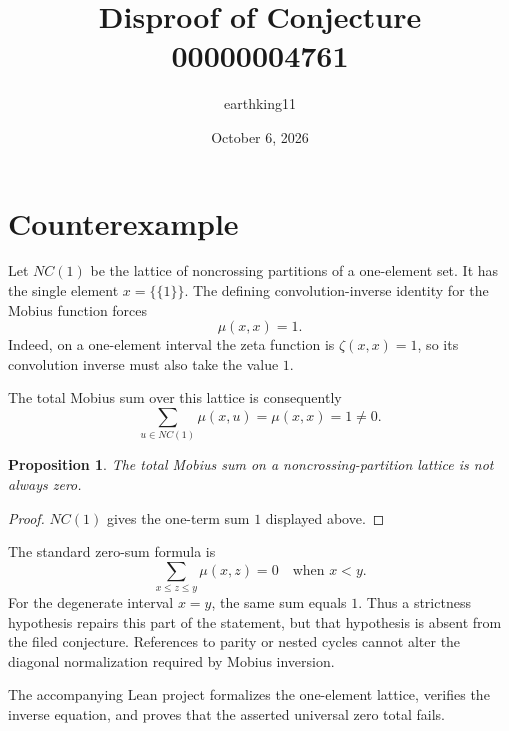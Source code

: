 \documentclass[11pt]{article}
\title{Disproof of Conjecture 00000004761}
\author{earthking11}
\date{October 6, 2026}
\newtheorem{proposition}{Proposition}
\begin{document}
\maketitle
\section*{Counterexample}
Let $NC(1)$ be the lattice of noncrossing partitions of a one-element set.
It has the single element $x=\{\{1\}\}$.  The defining convolution-inverse
identity for the Mobius function forces
\[
 \mu(x,x)=1.
\]
Indeed, on a one-element interval the zeta function is $\zeta(x,x)=1$, so its
convolution inverse must also take the value $1$.

The total Mobius sum over this lattice is consequently
\[
 \sum_{u\in NC(1)}\mu(x,u)=\mu(x,x)=1\ne0.
\]

\begin{proposition}
The total Mobius sum on a noncrossing-partition lattice is not always zero.
\end{proposition}
\begin{proof}
$NC(1)$ gives the one-term sum $1$ displayed above.
\end{proof}

The standard zero-sum formula is
\[
 \sum_{x\le z\le y}\mu(x,z)=0 \quad\text{when }x<y.
\]
For the degenerate interval $x=y$, the same sum equals $1$.  Thus a strictness
hypothesis repairs this part of the statement, but that hypothesis is absent
from the filed conjecture.  References to parity or nested cycles cannot alter
the diagonal normalization required by Mobius inversion.

The accompanying Lean project formalizes the one-element lattice, verifies
the inverse equation, and proves that the asserted universal zero total fails.
\end{document}
